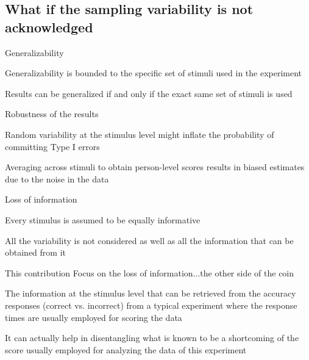 \documentclass[compress]{beamer}
\begin{document}
\subsection{What if the sampling variability is not acknowledged}

\begin{frame}{}
	
	
	\begin{block}{Generalizability}
	
	\small
	
	Generalizability is bounded to the specific set of stimuli used in the experiment
	 
	 Results can be generalized if and only if the exact same set of stimuli is used 
	

	\end{block}
	
	\pause
 
	\begin{block}{Robustness of the results}
		
		\small
		Random variability at the stimulus level might inflate the probability of committing Type I errors
		
		Averaging across stimuli to obtain person-level scores results in biased estimates due to the noise in the data
	\end{block}
	
	\pause
	
	\begin{block}{Loss of information}
		
		\small
		Every stimulus is assumed to be equally informative
		
		All the variability is not considered as well as all the information that can be obtained from it 
	\end{block}
	
\end{frame}

\begin{frame}{This contribution}
	Focus on the loss of information...the other side of the coin 
	
	\vspace{2.5mm}
	\pause
	The information at the stimulus level that can be retrieved from the accuracy responses (correct vs. incorrect) from a typical experiment where the response times are usually employed for scoring the data
	
	\vspace{2.5mm}
	\pause 
	It can actually help in disentangling what is known to be a shortcoming of the score usually employed for analyzing the data of this experiment
\end{frame}
\end{document}
